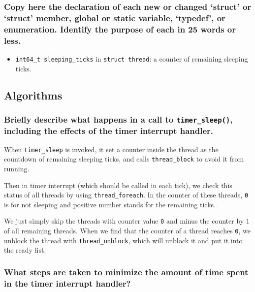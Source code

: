 \documentclass[sigconf, nonacm]{acmart}
\begin{document}
            \subsubsection{Copy here the declaration of each new or changed `struct' or `struct' member, global or static variable, `typedef', or enumeration.  Identify the purpose of each in 25 words or less. } 
            
                \begin{itemize}
                    \item \texttt{int64\_t sleeping\_ticks} in \texttt{struct thread}: a counter of remaining sleeping ticks. 
                \end{itemize}
        
        \subsection{Algorithms}
        
            \subsubsection{Briefly describe what happens in a call to \texttt{timer\_sleep()}, including the effects of the timer interrupt handler. }
                When \texttt{timer\_sleep} is invoked, it set a counter inside the thread as the countdown of remaining sleeping ticks, and calls \texttt{thread\_block} to avoid it from running. 
            
                Then in timer interrupt (which should be called in each tick), we check this status of all threads by using \texttt{thread\_foreach}. In the counter of these threads, \texttt{0} is for not sleeping and positive number stands for the remaining ticks.
            
                We just simply skip the threads with counter value \texttt{0} and minus the counter by 1 of all remaining threads. When we find that the counter of a thread reaches \texttt{0}, we unblock the thread with \texttt{thread\_unblock}, which will unblock it and put it into the ready list. 
            
            \subsubsection{What steps are taken to minimize the amount of time spent in the timer interrupt handler? }
                
        
\end{document}
